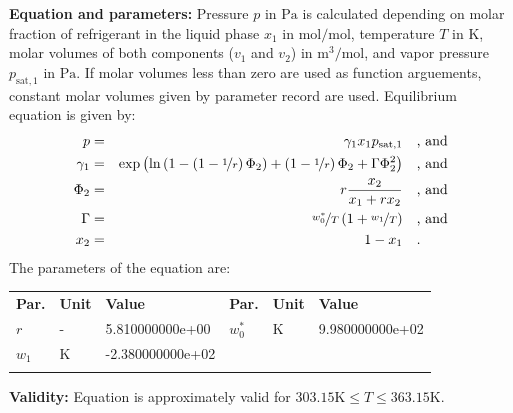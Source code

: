 \textbf{Equation and parameters:}
\newline
%
Pressure $p$ in $\si{\pascal}$ is calculated depending on molar fraction of refrigerant in the liquid phase $x_1$ in $\si{\mole\per\mole}$, temperature $T$ in $\si{\kelvin}$, molar volumes of both components ($v_1$ and $v_2$) in $\si{\cubic\meter\per\mole}$, and vapor pressure $p_\mathrm{sat,1}$ in $\si{\pascal}$. If molar volumes less than zero are used as function arguements, constant molar volumes given by parameter record are used. Equilibrium equation is given by:
%
\begin{equation*}
\begin{split}
p &=& \gamma_1 x_1 p_\mathrm{sat,1} & \quad\text{, and} \\
\gamma_1 &=& \exp \left( \ln \left( 1 - \left( 1 - \nicefrac{1}{r} \right) \Phi_2  \right) + \left(1 - \nicefrac{1}{r}\right) \Phi_2 + \Gamma \Phi_2 ^2 \right) & \quad\text{, and} \\
\Phi_2 &=& r \frac{x_2}{x_1 + r x_2} & \quad\text{, and} \\
\Gamma &=& \nicefrac{w_0^{*}}{T} \left( 1 + \nicefrac{w_1}{T} \right) & \quad\text{, and} \\
x_2 &=& 1 - x_1  & \quad\text{.} \\
\end{split}
\end{equation*}
%
The parameters of the equation are:
%
\begin{longtable}[l]{lll|lll}
\toprule
\addlinespace
\textbf{Par.} & \textbf{Unit} & \textbf{Value} &	\textbf{Par.} & \textbf{Unit} & \textbf{Value} \\
\addlinespace
\midrule
\endhead

\bottomrule
\endfoot
\bottomrule
\endlastfoot
\addlinespace

$r$ & - & 5.810000000e+00 & $w_0^{*}$ & $\si{\kelvin}$ & 9.980000000e+02 \\
$w_1$ & $\si{\kelvin}$ & -2.380000000e+02 & & & \\

\addlinespace\end{longtable}

\textbf{Validity:}
\newline
Equation is approximately valid for $303.15 \si{\kelvin} \leq T \leq 363.15 \si{\kelvin}$.
\newline

